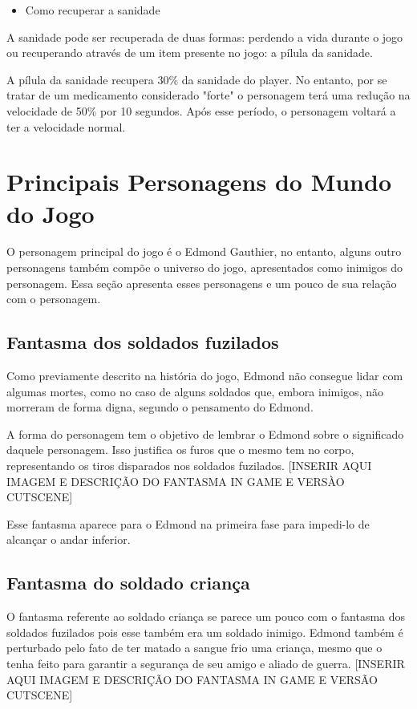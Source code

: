 \documentclass{article}
\begin{document}
\begin{itemize}
\item Como recuperar a sanidade
\end{itemize}

A sanidade pode ser recuperada de duas formas: perdendo a vida durante o jogo ou recuperando através de um item presente no jogo: a pílula da sanidade.

A  pílula da sanidade recupera 30\% da sanidade do player. No entanto, por se tratar de um medicamento considerado "forte" o personagem terá uma redução na velocidade de 50\% por 10 segundos. Após esse período, o personagem voltará a ter a velocidade normal.

\section{Principais Personagens do Mundo do Jogo}

O personagem principal do jogo é o Edmond Gauthier, no entanto, alguns outro personagens também compõe o universo do jogo, apresentados como inimigos do personagem. Essa seção apresenta esses personagens e um pouco de sua relação com o personagem.

\subsection{Fantasma dos soldados fuzilados}
Como previamente descrito na história do jogo, Edmond não consegue lidar com algumas mortes, como no caso de alguns soldados que, embora inimigos, não morreram de forma digna, segundo o pensamento do Edmond. 
	
	A forma do personagem tem o objetivo de lembrar o Edmond sobre o significado daquele personagem. Isso justifica os furos que o mesmo tem no corpo, representando os tiros disparados nos soldados fuzilados. [INSERIR AQUI IMAGEM E DESCRIÇÃO DO FANTASMA IN GAME E VERSÀO CUTSCENE]
	
	Esse fantasma aparece para o Edmond na primeira fase para impedi-lo de alcançar o andar inferior.

\subsection{Fantasma do soldado criança}
 O fantasma referente ao soldado criança se parece um pouco com o fantasma dos soldados fuzilados pois esse também era um soldado inimigo. Edmond também é perturbado pelo fato de ter matado a sangue frio uma criança, mesmo que o tenha feito para garantir a segurança de seu amigo e aliado de guerra. [INSERIR AQUI IMAGEM E DESCRIÇÃO DO FANTASMA IN GAME E VERSÃO CUTSCENE]
 
\end{document}
